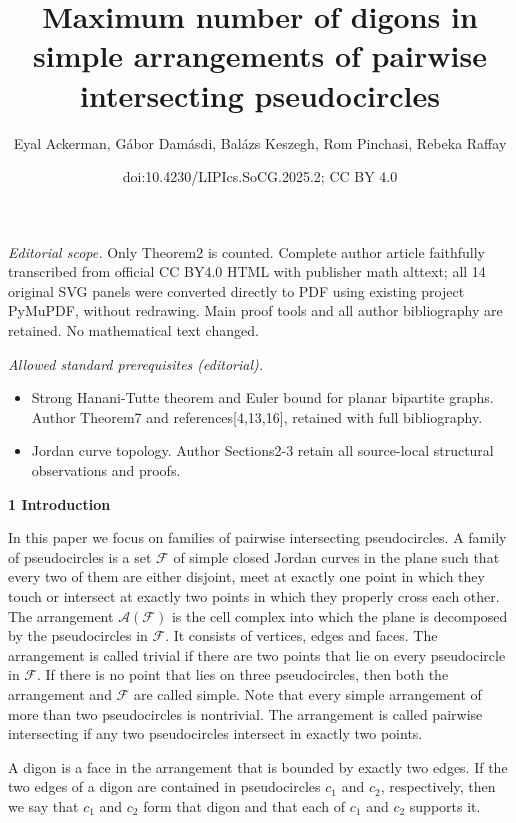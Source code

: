 \documentclass[10pt,a4paper]{amsart}
\title{Maximum number of digons in simple arrangements of pairwise intersecting pseudocircles}
\author{Eyal Ackerman, Gábor Damásdi, Balázs Keszegh, Rom Pinchasi, Rebeka Raffay}
\date{doi:10.4230/LIPIcs.SoCG.2025.2; CC BY 4.0}
\providecommand{\cal}{\mathcal}
\begin{document}
\maketitle
\noindent\textit{Editorial scope.} Only Theorem2 is counted. Complete author article faithfully transcribed from official CC BY4.0 HTML with publisher math alttext; all 14 original SVG panels were converted directly to PDF using existing project PyMuPDF, without redrawing. Main proof tools and all author bibliography are retained. No mathematical text changed.\par\medskip
\noindent\textit{Allowed standard prerequisites (editorial).}\begin{itemize}
\item Strong Hanani-Tutte theorem and Euler bound for planar bipartite graphs. Author Theorem7 and references[4,13,16], retained with full bibliography.
\item Jordan curve topology. Author Sections2-3 retain all source-local structural observations and proofs.
\end{itemize}\medskip
\par\medskip\noindent\textbf{1 Introduction}\par
In this paper we focus on families of pairwise intersecting pseudocircles. A family of pseudocircles is a set ${\cal{F}}$ of simple closed Jordan curves in the plane such that every two of them are either disjoint, meet at exactly one point in which they touch or intersect at exactly two points in which they properly cross each other. The arrangement ${\cal{A}}({\cal{F}})$ is the cell complex into which the plane is decomposed by the pseudocircles in ${\cal{F}}$. It consists of vertices, edges and faces. The arrangement is called trivial if there are two points that lie on every pseudocircle in ${\cal{F}}$. If there is no point that lies on three pseudocircles, then both the arrangement and ${\cal{F}}$ are called simple. Note that every simple arrangement of more than two pseudocircles is nontrivial. The arrangement is called pairwise intersecting if any two pseudocircles intersect in exactly two points.
\par
\par
A digon is a face in the arrangement that is bounded by exactly two edges. If the two edges of a digon are contained in pseudocircles $c_{1}$ and $c_{2}$, respectively, then we say that $c_{1}$ and $c_{2}$ form that digon and that each of $c_{1}$ and $c_{2}$ supports it.
\par
\end{document}
